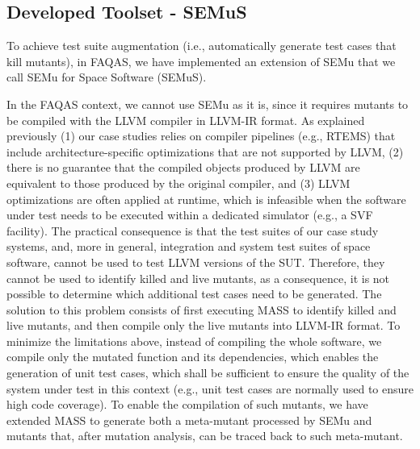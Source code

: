 
\newpage
\subsection{Developed Toolset - SEMuS}
\label{sec:semus}

\STARTCHANGEDWPT


To achieve test suite augmentation (i.e., automatically generate test cases that kill mutants), in FAQAS, we have implemented an extension of SEMu that we call SEMu for Space Software (SEMuS).



In the FAQAS context, we cannot use SEMu as it is, since it requires mutants to be compiled with the LLVM compiler in LLVM-IR format. As explained previously (1) our case studies relies on compiler pipelines (e.g., RTEMS) that include architecture-specific optimizations that are not supported by LLVM, (2) there is no guarantee that the compiled objects produced by LLVM are equivalent to those produced by the original compiler, and (3) LLVM optimizations are often applied at runtime, which is infeasible when the software under test needs to be executed within a dedicated simulator (e.g., a SVF facility). The practical consequence is that the test suites of our case study systems, and, more in general, integration and system test suites of space software, cannot be used to test LLVM versions of the SUT. 
Therefore, they cannot be used to identify killed and live mutants, as a consequence, it is not possible to determine which additional test cases need to be generated. 
The solution to this problem consists of first executing MASS to identify killed and live mutants, and then compile only the live mutants into LLVM-IR format. 
To minimize the limitations above, instead of compiling the whole software, we compile only the mutated function and its dependencies, which enables the generation of unit test cases, which shall be sufficient to ensure the quality of the system under test in this context (e.g., unit test cases are normally used to ensure high code coverage). To enable the compilation of such mutants, we have extended MASS to generate both a meta-mutant processed by SEMu and mutants that, after mutation analysis, can be traced back to such meta-mutant.

